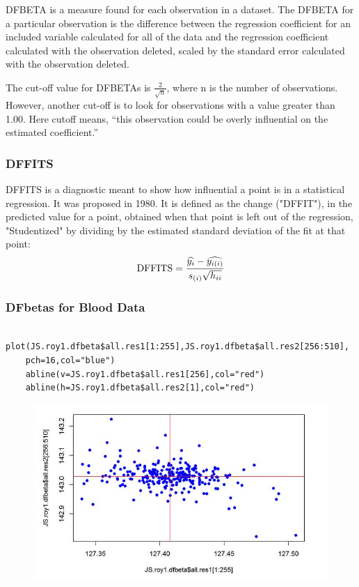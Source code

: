 \documentclass[Main.tex]{subfiles}
\begin{document}
DFBETA is a measure found for each observation in a dataset. The DFBETA for a 
particular observation is the difference between the regression coefficient for an included variable calculated for all of the data and the regression coefficient calculated with the observation deleted, scaled by the standard error calculated with the 
observation deleted. 

The cut-off value for DFBETAs is $\frac{2}{\sqrt{n}}$, where n is the number of observations. 
However, another cut-off is to look for observations with a value greater than 1.00. Here cutoff means, 
“this observation could be overly influential on the estimated coefficient.” 
\subsubsection{DFFITS}
DFFITS is a diagnostic meant to show how influential a point is in a statistical regression. It was proposed in 1980. It is defined as the change ("DFFIT"), in the predicted value for a point, obtained when that point is left out of the regression, "Studentized" by dividing by the estimated standard deviation of the fit at that point:
\[ \mbox{DFFITS} = {\widehat{y_i} - \widehat{y_{i(i)}} \over s_{(i)} \sqrt{h_{ii}}}\]

\subsubsection{DFbetas for Blood Data}
\begin{framed}
	\begin{verbatim}
	plot(JS.roy1.dfbeta$all.res1[1:255],JS.roy1.dfbeta$all.res2[256:510],
	pch=16,col="blue")
	abline(v=JS.roy1.dfbeta$all.res1[256],col="red")
	abline(h=JS.roy1.dfbeta$all.res2[1],col="red")
	\end{verbatim}
\end{framed}
\begin{figure}
	\centering
	\includegraphics[width=0.7\linewidth]{dfbetas-JS-ROY}
	\caption{}
	\label{fig:dfbetas-JS-ROY}
\end{figure}
\end{document}
